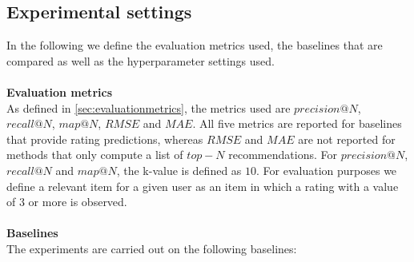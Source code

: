 \subsection{Experimental settings}
In the following we define the evaluation metrics used, the baselines that are compared as well as the hyperparameter settings used.
\\\\
\textbf{Evaluation metrics}\\
As defined in \autoref{sec:evaluationmetrics}, the metrics used are $precision@N$, $recall@N$, $map@N$, $RMSE$ and $MAE$.
All five metrics are reported for baselines that provide rating predictions, whereas $RMSE$ and $MAE$ are not reported for methods that only compute a list of $top-N$ recommendations.
For $precision@N$, $recall@N$ and $map@N$, the k-value is defined as $10$.
For evaluation purposes we define a relevant item for a given user as an item in which a rating with a value of $3$ or more is observed. 
\\\\
\textbf{Baselines}\\
The experiments are carried out on the following baselines:
